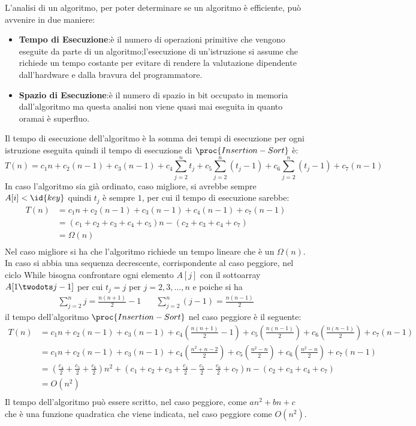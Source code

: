 L'analisi di un algoritmo, per poter determinare se un algoritmo è efficiente, può
avvenire in due maniere:
\begin{itemize}
  \item \textbf{Tempo di Esecuzione}:è il numero di operazioni primitive che vengono eseguite
        da parte di un algoritmo;l'esecuzione di un'istruzione si assume che richiede un tempo costante
        per evitare di rendere la valutazione dipendente dall'hardware e dalla bravura del programmatore.
  \item \textbf{Spazio di Esecuzione}:è il numero di spazio in bit occupato in memoria dall'algoritmo
        ma questa analisi non viene quasi mai eseguita in quanto oramai è superfluo.
\end{itemize}
Il tempo di esecuzione dell'algoritmo è la somma dei tempi di esecuzione per ogni
istruzione eseguita quindi il tempo di esecuzione di $\proc{Insertion-Sort}$ è:
\begin{equation*}
    T(n) = c_1n + c_2(n-1) + c_3(n-1) + c_4 \sum_{j=2} ^n t_j + c_5 \sum_{j=2} ^n (t_j -1)
         + c_6 \sum_{j=2} ^n (t_j -1) + c_7(n-1)
\end{equation*}
In caso l'algoritmo sia già ordinato, caso migliore, si avrebbe sempre $A[i] < \id{key}$
quindi $t_j$ è sempre $1$, per cui il tempo di esecuzione sarebbe:
\begin{align*}
    T(n) & = c_1n + c_2(n-1) + c_3(n-1) + c_4(n-1) + c_7(n-1) \\
         & = (c_1 + c_2 + c_3 + c_4 + c_5)n - (c_2 + c_3+ c_4+ c_7) \\
         & = \Omega(n) \\
\end{align*}
Nel caso migliore si ha che l'algoritmo richiede un tempo lineare che è un $\Omega(n)$.\newline
In caso si abbia una sequenza decrescente, corrispondente al caso peggiore, nel ciclo While bisogna
confrontare ogni elemento $A[j]$ con il sottoarray $A[1 \twodots j-1]$ per cui $t_j = j$
per $j=2,3,\dots,n$ e poiche si ha
\begin{align*}
    \sum _{j=2} ^ n j = \frac{n(n+1)}{2} -1 & \quad \sum_{j=2}^n (j-1) = \frac{n(n-1)}{2}
\end{align*}
il tempo dell'algoritmo $\proc{Insertion-Sort}$ nel caso peggiore è il seguente:
\begin{align*}
    T(n) & = c_1n + c_2(n-1) + c_3(n-1) + c_4 (\frac{n(n+1)}{2} -1) + c_5 (\frac{n(n-1)}{2})
         + c_6 (\frac{n(n-1)}{2}) + c_7(n-1) \\
         & = c_1n + c_2(n-1) + c_3(n-1) + c_4(\frac{n^2+n-2}{2}) + c_5(\frac{n^2-n}{2})
           + c_6(\frac{n^2-n}{2}) + c_7(n-1) \\
         & = (\frac{c_4}{2} +\frac{c_5}{2} + \frac{c_6}{2})n^2 + (c_1+c_2+c_3+\frac{c_4}{2} - \frac{c_5}{2}
            -\frac{c_6}{2}+c_7)n -(c_2+c_3+c_4+c_7)\\
         & = O(n^2)\\
\end{align*}
Il tempo dell'algoritmo può essere scritto, nel caso peggiore, come $an^2 + bn + c$ che è una funzione
quadratica che viene indicata, nel caso peggiore come $O(n^2)$.

